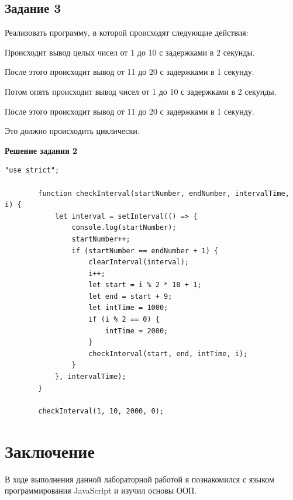 \documentclass[12pt]{report}
\begin{document}
	\section{Задание 3}
	\noindent Реализовать программу, в которой происходят следующие действия:\par
	\noindent Происходит вывод целых чисел от 1 до 10 с задержками в 2 секунды.\par
	\noindent После этого происходит вывод от 11 до 20 с задержками в 1 секунду.\par
	\noindent Потом опять происходит вывод чисел от 1 до 10 с задержками в 2 секунды.\par
	\noindent После этого происходит вывод от 11 до 20 с задержками в 1 секунду.\par
	\noindent Это должно происходить циклически.\par
	\noindent\textbf{Решение задания 2}	
	\begin{lstlisting}[label=Task2.3,caption=Файл index.js]
		"use strict";
		
		function checkInterval(startNumber, endNumber, intervalTime, i) {
			let interval = setInterval(() => {
				console.log(startNumber);
				startNumber++;
				if (startNumber == endNumber + 1) {
					clearInterval(interval);
					i++;
					let start = i % 2 * 10 + 1;
					let end = start + 9;
					let intTime = 1000;
					if (i % 2 == 0) {
						intTime = 2000;
					}
					checkInterval(start, end, intTime, i);
				}
			}, intervalTime);
		}

		checkInterval(1, 10, 2000, 0);

	\end{lstlisting}
	
	\restoregeometry
	\newpage
	\chapter*{Заключение}
	В ходе выполнения данной лабораторной работой я познакомился с языком программирования JavaScript и изучил основы ООП.
\end{document}
